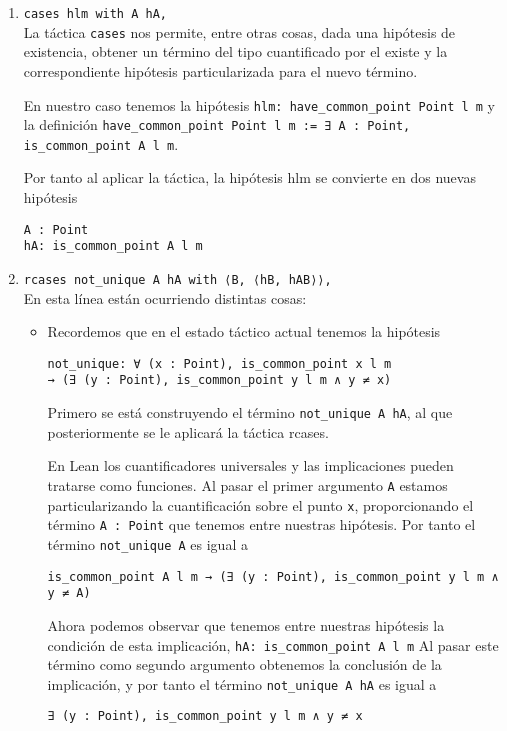\begin{enumerate}[label=L.\arabic*, topsep=0mm]
	\item \lstinline{cases hlm with A hA,}\\[.5em] La táctica \lstinline{cases} nos
	      permite, entre otras cosas, dada una hipótesis de existencia, obtener un
	      término del tipo cuantificado por el existe y la correspondiente hipótesis
	      particularizada para el nuevo término.

	      En nuestro caso tenemos la hipótesis \lstinline{hlm: have_common_point Point l m} y la definición
	      \lstinline{have_common_point Point l m := ∃ A : Point, is_common_point A l m}.

	      Por tanto al aplicar la táctica, la hipótesis hlm se convierte en dos
	      nuevas hipótesis
	      \begin{lstlisting}
A : Point 
hA: is_common_point A l m
\end{lstlisting}

	\item \lstinline{rcases not_unique A hA with ⟨B, ⟨hB, hAB⟩⟩,}\\[.5em] En esta línea
	      están ocurriendo distintas cosas:
	      \begin{itemize}
		      \item Recordemos que en el estado táctico actual tenemos la hipótesis
		            \begin{lstlisting}
not_unique: ∀ (x : Point), is_common_point x l m 
→ (∃ (y : Point), is_common_point y l m ∧ y ≠ x) 
\end{lstlisting}

		            Primero se está construyendo el término \lstinline{not_unique A hA},
		            al que posteriormente se le aplicará la táctica {rcases}.

		            En Lean los cuantificadores universales y las implicaciones pueden
		            tratarse como funciones. Al pasar el primer argumento \lstinline{A}
		            estamos particularizando la cuantificación sobre el punto
		            \lstinline{x}, proporcionando el término \lstinline{A : Point} que
		            tenemos entre nuestras hipótesis. Por tanto el término
		            \lstinline{not_unique A} es igual a
		            \begin{lstlisting}
is_common_point A l m → (∃ (y : Point), is_common_point y l m ∧ y ≠ A)
\end{lstlisting}

		            Ahora podemos observar que tenemos entre nuestras hipótesis la
		            condición de esta implicación, \lstinline{hA: is_common_point A l m}
		            Al pasar este término como segundo argumento obtenemos la conclusión
		            de la implicación, y por tanto el término
		            \lstinline{not_unique A hA} es igual a
		            \begin{lstlisting}
∃ (y : Point), is_common_point y l m ∧ y ≠ x
\end{lstlisting}


\end{itemize}
\end{enumerate}
